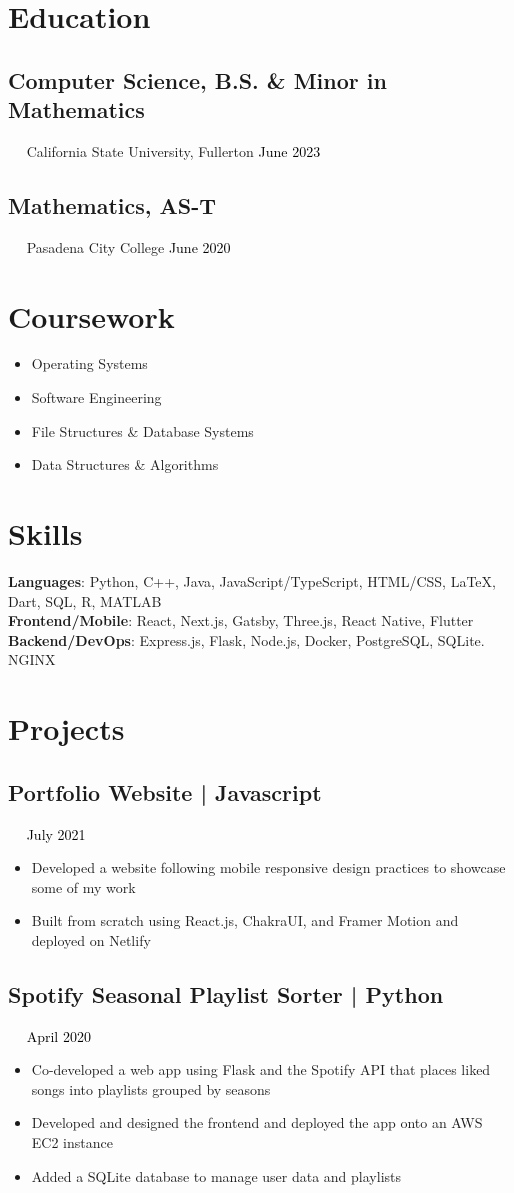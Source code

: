 \documentclass{article}
\newcommand{\resumesection}[3]{
    \subsection*{#1}
    \ 
    \ 
    \small
    \textcolor{csufgrey}{#2}
    \normalsize
    \hfill
    \textcolor{black}{#3}
    \normalsize
}
\begin{document}
\pagestyle{useheader}

\section*{Education}
\resumesection{Computer Science, B.S. \& Minor in Mathematics}{California State University, Fullerton}{June 2023}%
\resumesection{Mathematics, AS-T}{Pasadena City College}{June 2020}
\section*{Coursework}
\setlength{\multicolsep}{0pt}
\begin{multicols}{2}
    \noindent
    \begin{itemize}
        \item Operating Systems
        \item Software Engineering
        \item File Structures \& Database Systems
        \item Data Structures \& Algorithms
    \end{itemize}
\end{multicols}
\hfill
\section*{Skills}
\textbf{Languages}: Python, C++, Java, JavaScript/TypeScript, HTML/CSS, {\selectfont\LaTeX}, Dart, SQL, R, MATLAB\\
\textbf{Frontend/Mobile}: React, Next.js, Gatsby, Three.js, React Native, Flutter\\
\textbf{Backend/DevOps}: Express.js, Flask, Node.js, Docker, PostgreSQL, SQLite. NGINX\\
\section*{Projects}
\resumesection{Portfolio Website | Javascript}{}{July 2021}
\begin{itemize}
    \item Developed a website following mobile responsive design practices to showcase some of my work
    \item Built from scratch using React.js, ChakraUI, and Framer Motion and deployed on Netlify
\end{itemize}
\resumesection{Spotify Seasonal Playlist Sorter | Python}{}{April 2020}
\begin{itemize}
    \item Co-developed a web app using Flask and the Spotify API that places liked songs into playlists grouped by seasons
    \item Developed and designed the frontend and deployed the app onto an AWS EC2 instance
    \item Added a SQLite database to manage user data and playlists
\end{itemize}
\end{document}
